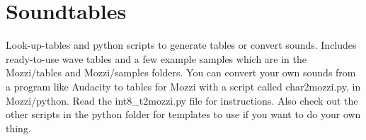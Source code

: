 \hypertarget{group__soundtables}{}\section{Soundtables}
\label{group__soundtables}
Look-\/up-\/tables and python scripts to generate tables or convert sounds. Includes ready-\/to-\/use wave tables and a few example samples which are in the Mozzi/tables and Mozzi/samples folders. You can convert your own sounds from a program like Audacity to tables for Mozzi with a script called char2mozzi.\+py, in Mozzi/python. Read the int8\+\_\+t2mozzi.\+py file for instructions. Also check out the other scripts in the python folder for templates to use if you want to do your own thing. 